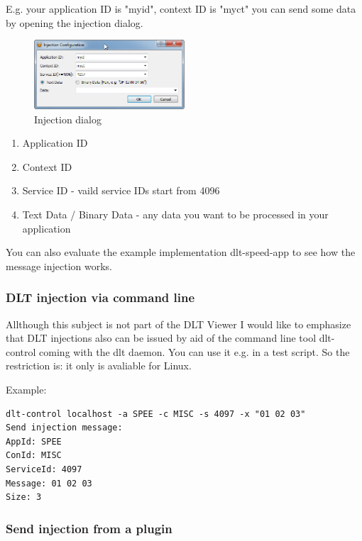 \documentclass[a4paper,11pt]{article}
\begin{document}
E.g. your application ID is "myid", context ID is "myct" you can send some data by opening the injection dialog.



\begin{figure}[H]
 \centering
  \includegraphics[width=0.5\textwidth]{images/injectionconfiguration.png}
 \caption{Injection dialog}
 \label{fig:Injectiondialog}
\end{figure}

\begin{enumerate}
\item Application ID
\item Context ID
\item Service ID - vaild service IDs start from 4096
\item Text Data / Binary Data - any data you want to be processed in your application
 \end{enumerate}

You can also evaluate the example implementation dlt-speed-app to see how the message injection works.

\subsubsection{DLT injection via command line}

Allthough this subject is not part of the DLT Viewer I would like to emphasize that DLT injections also can 
be issued by aid of the command line tool dlt-control coming with the dlt daemon.  You can use it e.g. in
a test script. So the restriction is: it only is avaliable for Linux.

Example:

\begin{verbatim}
dlt-control localhost -a SPEE -c MISC -s 4097 -x "01 02 03"
Send injection message:
AppId: SPEE
ConId: MISC
ServiceId: 4097
Message: 01 02 03
Size: 3
\end{verbatim}

\subsubsection{Send injection from a plugin}
\end{document}
